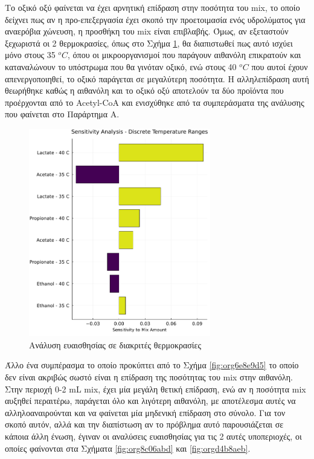 \documentclass[11pt]{report}
\begin{document}
Το οξικό οξύ φαίνεται να έχει αρνητική επίδραση στην ποσότητα του \acrshort{mix}, το οποίο δείχνει πως αν η προ-επεξεργασία έχει σκοπό την προετοιμασία ενός υδρολύματος για αναερόβια χώνευση, η προσθήκη του \acrshort{mix} είναι επιβλαβής. Όμως, αν εξεταστούν ξεχωριστά οι 2 θερμοκρασίες, όπως στο Σχήμα \ref{fig:org0129dfe}, θα διαπιστωθεί πως αυτό ισχύει μόνο στους 35 \(^oC\), όπου οι μικροοργανισμοί που παράγουν αιθανόλη επικρατούν και καταναλώνουν το υπόστρωμα που θα γινόταν οξικό, ενώ στους 40 \(^oC\) που αυτοί έχουν απενεργοποιηθεί, το οξικό παράγεται σε μεγαλύτερη ποσότητα. Η αλληλεπίδραση αυτή θεωρήθηκε καθώς η αιθανόλη και το οξικό οξύ αποτελούν τα δύο προϊόντα που προέρχονται από το Acetyl-CoA και ενισχύθηκε από τα συμπεράσματα της ανάλυσης που φαίνεται στο Παράρτημα A. 

\begin{figure}[htbp]
\centering
\includegraphics[width=300px]{../plots/sensitivity/temperature_tornado.png}
\caption{\label{fig:org0129dfe}Ανάλυση ευαισθησίας σε διακριτές θερμοκρασίες}
\end{figure}

Άλλο ένα συμπέρασμα το οποίο προκύπτει από το Σχήμα \ref{fig:org6e8e9d5} το οποίο δεν είναι ακριβώς σωστό είναι η επίδραση της ποσότητας του \acrshort{mix} στην αιθανόλη. Στην περιοχή 0-2 mL \acrshort{mix}, έχει μία μεγάλη θετική επίδραση, ενώ αν η ποσότητα \acrshort{mix} αυξηθεί περαιτέρω, παράγεται όλο και λιγότερη αιθανόλη, με αποτέλεσμα αυτές να αλληλοαναιρούνται και να φαίνεται μία μηδενική επίδραση στο σύνολο. Για τον σκοπό αυτόν, αλλά και την διαπίστωση αν το πρόβλημα αυτό παρουσιάζεται σε κάποια άλλη ένωση, έγιναν οι αναλύσεις ευαισθησίας για τις 2 αυτές υποπεριοχές, οι οποίες φαίνονται στα Σχήματα \ref{fig:org8c06abd} και \ref{fig:orgd4b8aeb}.
\end{document}
